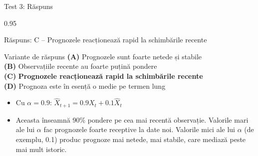 \documentclass[9pt, aspectratio=169, t]{beamer}
\begin{document}
\begin{frame}{Test 3: Răspuns}
    \begin{cminipage}{0.95\textwidth}
    \begin{exampleblock}{Răspuns: C -- Prognozele reacționează rapid la schimbările recente}
    {\small
        \begin{block}{Variante de răspuns}
            \textcolor{MainBlue}{\textbf{(A)}} Prognozele sunt foarte netede și stabile \incorrect\\[3pt]
            \textcolor{MainBlue}{\textbf{(B)}} Observațiile recente au foarte puțină pondere \incorrect\\[3pt]
            \textcolor{MainBlue}{\textbf{(C)}} \textbf{\textcolor{Forest}{Prognozele reacționează rapid la schimbările recente}} \correct\\[3pt]
            \textcolor{MainBlue}{\textbf{(D)}} Prognoza este în esență o medie pe termen lung \incorrect
        \end{block}

        \vspace{0.1cm}

        \begin{itemize}\setlength{\itemsep}{0pt}
            \item Cu $\alpha = 0.9$: $\hat{X}_{t+1} = 0.9 X_t + 0.1 \hat{X}_t$
            \item Aceasta înseamnă 90\% pondere pe cea mai recentă observație. Valorile mari ale lui $\alpha$ fac prognozele foarte receptive la date noi. Valorile mici ale lui $\alpha$ (de exemplu, 0.1) produc prognoze mai netede, mai stabile, care mediază peste mai mult istoric.
        \end{itemize}
    }
    \end{exampleblock}
    \end{cminipage}
\end{frame}
\end{document}
